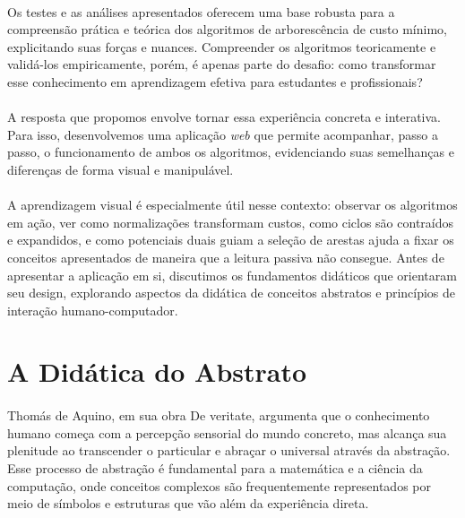 \documentclass[12pt,a4paper]{article}
\def\emph#1{#1}%
\begin{document}
\paragraph{}
Os testes e as análises apresentados oferecem uma base robusta para a compreensão prática e teórica dos algoritmos de arborescência de custo mínimo, explicitando suas forças e nuances. Compreender os algoritmos teoricamente e validá-los empiricamente, porém, é apenas parte do desafio: como transformar esse conhecimento em aprendizagem efetiva para estudantes e profissionais?

\paragraph{}
A resposta que propomos envolve tornar essa experiência concreta e interativa. Para isso, desenvolvemos uma aplicação \textit{web} que permite acompanhar, passo a passo, o funcionamento de ambos os algoritmos, evidenciando suas semelhanças e diferenças de forma visual e manipulável.

\paragraph{}
A aprendizagem visual é especialmente útil nesse contexto: observar os algoritmos em ação, ver como normalizações transformam custos, como ciclos são contraídos e expandidos, e como potenciais duais guiam a seleção de arestas ajuda a fixar os conceitos apresentados de maneira que a leitura passiva não consegue. Antes de apresentar a aplicação em si, discutimos os fundamentos didáticos que orientaram seu design, explorando aspectos da didática de conceitos abstratos e princípios de interação humano-computador.

\section{A Didática do Abstrato}

\paragraph{}
Thomás de Aquino, em sua obra \emph{De veritate}, argumenta que o conhecimento humano começa com a percepção sensorial do mundo concreto, mas alcança sua plenitude ao transcender o particular e abraçar o universal através da abstração. Esse processo de abstração é fundamental para a matemática e a ciência da computação, onde conceitos complexos são frequentemente representados por meio de símbolos e estruturas que vão além da experiência direta.
\end{document}
